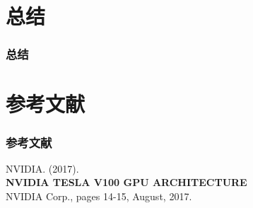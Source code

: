 \documentclass[10pt,aspectratio=169,mathserif]{beamer}
\begin{document}
	\section{总结}
	\begin{frame}
		\frametitle{总结}
	\end{frame}

	\section{参考文献}
	\begin{frame}
		\frametitle{参考文献}
		\begin{thebibliography}{99}
			 NVIDIA. (2017).\\
			{\bf NVIDIA TESLA V100 GPU ARCHITECTURE} \\
			NVIDIA Corp., pages 14-15, August, 2017.
		\end{thebibliography}
	\end{frame}

	
\end{document}
